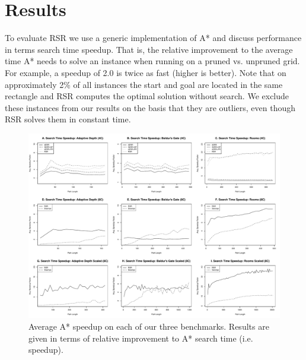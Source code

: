 \section{Results}
\label{sec-results}
To evaluate RSR we use a generic implementation of A* and discuss performance 
in terms search time speedup. That is, the relative improvement to the average 
time A* needs to solve an instance when running on a pruned  vs. unpruned grid.
For example, a speedup of 2.0 is twice as fast (higher is better).
%
Note that on approximately 2\% of all instances the start and goal are located
in the same rectangle and RSR computes the optimal solution without
search.  We exclude these instances from our results on the basis that they are 
outliers, even though RSR solves them in constant time.

\par 
\begin{figure}[t]
       \begin{center}
                       \includegraphics[width=0.97\columnwidth, trim = 10mm 10mm 10mm 0mm]{diagrams/speedup.pdf}
       \end{center}
       \caption{Average A* speedup on each of our three benchmarks. 
		Results are given in terms of relative improvement to A* search time (i.e. speedup).}
\label{fig-speedup}
\end{figure}


